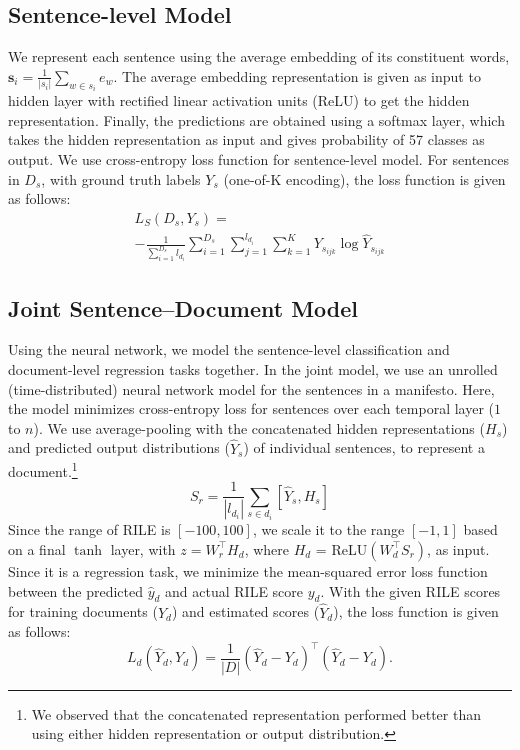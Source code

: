 \documentclass[11pt,a4paper]{article}
\begin{document}
\subsection{Sentence-level Model}
We represent each sentence using the average embedding of its constituent words, $ \bm{s}_{i} = \frac{1}{|s_{i}|}\sum_{w \in s_{i}} e_{w}$.
The average embedding representation is given as input to hidden layer with rectified linear activation units (ReLU) to get the hidden representation. Finally, the predictions are obtained using a softmax layer, which takes the hidden representation as input and gives probability of 57 classes as output.
We use cross-entropy loss function for sentence-level model. For sentences in $D_{s}$, with ground truth labels $Y_{s}$ (one-of-K encoding), the loss function is given as follows:
  \begin{multline}
    \label{eq:sent-loss}
    L_{S}(D_{s},Y_{s})= \\
    -\frac{1}{\sum_{i=1}^{D_{s}}l_{d_{i}}}\sum_{i=1}^{D_{s}}\sum_{j=1}^{l_{d_{i}}}\sum_{k=1}^{K} Y_{s_{ijk}} \log \hat{Y}_{s_{ijk}}  
  \end{multline}

\subsection{Joint Sentence--Document Model}
Using the neural network, we model the sentence-level classification and document-level regression tasks together. In the joint model, we use an unrolled (time-distributed) neural network model for the sentences in a manifesto. Here, the model minimizes cross-entropy loss for sentences over each temporal layer ($1$ to $n$). We use average-pooling with the concatenated hidden representations ($H_{s}$) and predicted output distributions ($\hat{Y}_{s}$) of individual sentences, to represent a document.\footnote{We observed that the concatenated representation performed better than using either hidden representation or output distribution.}
\begin{equation}
 S_{r} = \frac{1}{|l_{d_{i}}|}\sum_{s \in d_{i}} [\hat{Y}_{s}, H_{s}] 
\end{equation}
Since the range of RILE is $[-100,100]$, we scale it to the range $[-1,1]$ based on a final $\tanh$ layer, with $z = W_{r}^\top H_{d}$, where $H_{d}$ = ReLU$(W_{d}^\top S_{r})$, as input.
Since it is a regression task, we minimize the mean-squared error loss function between the predicted $\hat{y}_{d}$ and actual RILE score $y_{d}$. With the given RILE scores for training documents ($Y_{d}$) and estimated scores ($\hat{Y}_{d}$), the loss function is given as follows:
\begin{equation}
L_{d}(\hat{Y}_{d}, Y_{d}) = \frac{1}{|D|}  (\hat{Y}_{d} - Y_{d})^\top (\hat{Y}_{d} - Y_{d}).
\label{eq:doc-loss}
\end{equation}
\end{document}
